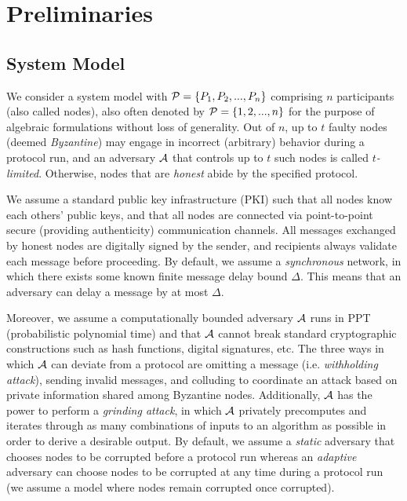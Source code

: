 \section{Preliminaries}
\label{section:preliminaries}
\subsection{System Model}
We consider a system model with $\mathcal{P} = \{P_1, P_2, ..., P_n\}$ comprising $n$ participants (also called nodes), also often denoted by $\mathcal{P} = \{1, 2, ..., n\}$ for the purpose of algebraic formulations without loss of generality. Out of $n$, up to $t$ faulty nodes (deemed \textit{Byzantine}) may engage in incorrect (arbitrary) behavior during a protocol run, and an adversary $\mathcal{A}$ that controls up to $t$ such nodes is called \textit{$t$-limited}. Otherwise, nodes that are \textit{honest} abide by the specified protocol.

We assume a standard public key infrastructure (PKI) such that all nodes know each others' public keys, and that all nodes are connected via point-to-point secure (providing authenticity) communication channels. All messages exchanged by honest nodes are digitally signed by the sender, and recipients always validate each message before proceeding. By default, we assume a \textit{synchronous} network, in which there exists some known finite message delay bound $\Delta$. This means that an adversary can delay a message by at most $\Delta$.

Moreover, we assume a computationally bounded adversary $\mathcal{A}$ runs in PPT (probabilistic polynomial time) and that $\mathcal{A}$ cannot break standard cryptographic constructions such as hash functions, digital signatures, etc. The three ways in which $\mathcal{A}$ can deviate from a protocol are omitting a message (i.e. \textit{withholding attack}), sending invalid messages, and colluding to coordinate an attack based on private information shared among Byzantine nodes. Additionally, $\mathcal{A}$ has the power to perform a \textit{grinding attack}, in which $\mathcal{A}$ privately precomputes and iterates through as many combinations of inputs to an algorithm as possible in order to derive a desirable output. By default, we assume a \textit{static} adversary that chooses nodes to be corrupted before a protocol run whereas an \textit{adaptive} adversary can choose nodes to be corrupted at any time during a protocol run (we assume a model where nodes remain corrupted once corrupted).

